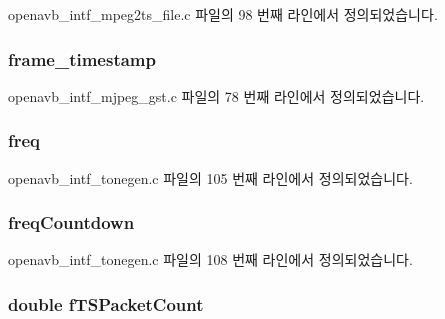 openavb\+\_\+intf\+\_\+mpeg2ts\+\_\+file.\+c 파일의 98 번째 라인에서 정의되었습니다.

\subsubsection[{\texorpdfstring{frame\+\_\+timestamp}{frame_timestamp}}]{ frame\+\_\+timestamp}\hypertarget{structpvt__data__t_a03f4a6b3e8357d3fb09d29d6c42e4c19}{}\label{structpvt__data__t_a03f4a6b3e8357d3fb09d29d6c42e4c19}


openavb\+\_\+intf\+\_\+mjpeg\+\_\+gst.\+c 파일의 78 번째 라인에서 정의되었습니다.

\subsubsection[{\texorpdfstring{freq}{freq}}]{ freq}\hypertarget{structpvt__data__t_ab5856fa4ff4ce7d9aff90cd3f36a1724}{}\label{structpvt__data__t_ab5856fa4ff4ce7d9aff90cd3f36a1724}


openavb\+\_\+intf\+\_\+tonegen.\+c 파일의 105 번째 라인에서 정의되었습니다.

\subsubsection[{\texorpdfstring{freq\+Countdown}{freqCountdown}}]{ freq\+Countdown}\hypertarget{structpvt__data__t_afb4d211f6a7e2be34887605bd2cbe5be}{}\label{structpvt__data__t_afb4d211f6a7e2be34887605bd2cbe5be}


openavb\+\_\+intf\+\_\+tonegen.\+c 파일의 108 번째 라인에서 정의되었습니다.

\subsubsection[{\texorpdfstring{f\+T\+S\+Packet\+Count}{fTSPacketCount}}]{\setlength{\rightskip}{0pt plus 5cm}double f\+T\+S\+Packet\+Count}\hypertarget{structpvt__data__t_a45ba86fdef1b64912c361671d4979627}{}\label{structpvt__data__t_a45ba86fdef1b64912c361671d4979627}


